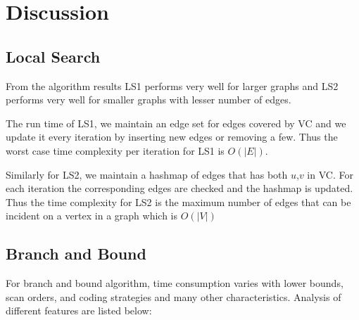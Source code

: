 \section{Discussion}
\subsection{Local Search}
From the algorithm results LS1 performs very well for larger graphs and LS2 performs very well for smaller graphs with lesser number of edges.

The run time of LS1, we maintain an edge set for edges covered by VC and we update it every iteration by inserting new edges or removing a few. Thus the worst case time complexity per iteration for LS1 is $O(|E|)$.

Similarly for LS2, we maintain a hashmap of edges that has both $u$,$v$  in VC. For each iteration the corresponding edges are checked and the hashmap is updated. Thus the time complexity for LS2 is the maximum number of edges that can be incident on a vertex in a graph which is $O(|V|)$

\subsection{Branch and Bound}
For branch and bound algorithm, time consumption varies with lower bounds, scan orders, and coding strategies and many other characteristics. Analysis of different features are listed below:
